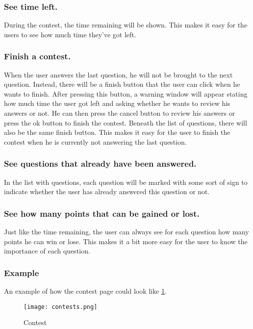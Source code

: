 \subsubsection{See time left.} 
During the contest, the time remaining will be shown. This makes it easy for the users to see how much time they've got left. 

\subsubsection{Finish a contest.} 
When the user answers the last question, he will not be brought to the next question. Instead, there will be a finish button that the user can click when he wants to finish. After pressing this button, a warning window will appear stating how much time the user got left and asking whether he wants to review his answers or not. He can then press the cancel button to review his answers or press the ok button to finish the contest. Beneath the list of questions, there will also be the same finish button. This makes it easy for the user to finish the contest when he is currently not answering the last question. 

\subsubsection{See questions that already have been answered.} 
In the list with questions, each question will be marked with some sort of sign to indicate whether the user has already answered this question or not. 

\subsubsection{See how many points that can be gained or lost.}
Just like the time remaining, the user can always see for each question how many points he can win or lose. This makes it a bit more easy for the user to know the importance of each question. 

\subsubsection{Example}
An example of how the contest page could look like \ref{Contest}.
		\begin{figure}[h]
		  \centering
			\texttt{[image: contests.png]}
		  \caption{Contest}
		  \label{Contest}
		\end{figure}

